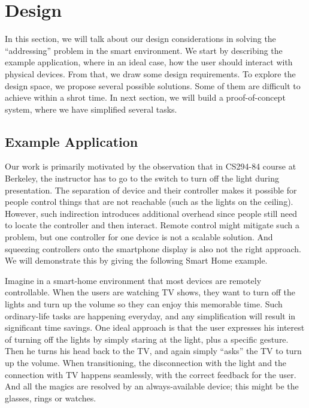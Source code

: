 \section{Design}
\label{sec:design}


In this section, we will talk about our design considerations in solving the ``addressing'' problem in the smart environment. We start by describing the example application, where in an ideal case, how the user should interact with physical devices. From that, we draw some design requirements. To explore the design space, we propose several possible solutions. Some of them are difficult to achieve within a shrot time. In next section, we will build a proof-of-concept system, where we have simplified several tasks.

\subsection{Example Application}
\label{sec:example-application}

Our work is primarily motivated by the observation that in CS294-84 course at Berkeley, the instructor has to go to the switch to turn off the light during presentation. The separation of device and their controller makes it possible for people control things that are not reachable (such as the lights on the ceiling). However, such indirection introduces additional overhead since people still need to locate the controller and then interact. Remote control might mitigate such a problem, but one controller for one device is not a scalable solution. And squeezing controllers onto the smartphone display is also not the right approach. We will demonstrate this by giving the following Smart Home example.

Imagine in a smart-home environment that most devices are remotely controllable. When the users are watching TV shows, they want to turn off the lights and turn up the volume so they can enjoy this memorable time. Such ordinary-life tasks are happening everyday, and any simplification will result in significant time savings. One ideal approach is that the user expresses his interest of turning off the lights by simply staring at the light, plus a specific gesture. Then he turns his head back to the TV, and again simply ``asks'' the TV to turn up the volume. When transitioning, the disconnection with the light and the connection with TV happens seamlessly, with the correct feedback for the user. And all the magics are resolved by an always-available device; this might be the glasses, rings or watches. 

